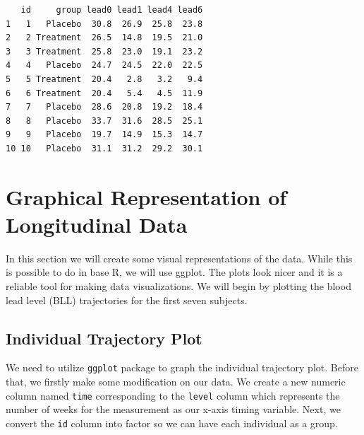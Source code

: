 \documentclass[
  letterpaper,
  DIV=11,
  numbers=noendperiod]{scrreprt}
\newenvironment{Shaded}{\begin{snugshade}}{\end{snugshade}}
\newcommand{\CommentTok}[1]{\textcolor[rgb]{0.37,0.37,0.37}{#1}}
\newcommand{\DecValTok}[1]{\textcolor[rgb]{0.68,0.00,0.00}{#1}}
\newcommand{\FunctionTok}[1]{\textcolor[rgb]{0.28,0.35,0.67}{#1}}
\newcommand{\NormalTok}[1]{\textcolor[rgb]{0.00,0.23,0.31}{#1}}
\newcommand{\OtherTok}[1]{\textcolor[rgb]{0.00,0.23,0.31}{#1}}
\newcommand{\SpecialCharTok}[1]{\textcolor[rgb]{0.37,0.37,0.37}{#1}}
\begin{document}
\begin{verbatim}
   id     group lead0 lead1 lead4 lead6
1   1   Placebo  30.8  26.9  25.8  23.8
2   2 Treatment  26.5  14.8  19.5  21.0
3   3 Treatment  25.8  23.0  19.1  23.2
4   4   Placebo  24.7  24.5  22.0  22.5
5   5 Treatment  20.4   2.8   3.2   9.4
6   6 Treatment  20.4   5.4   4.5  11.9
7   7   Placebo  28.6  20.8  19.2  18.4
8   8   Placebo  33.7  31.6  28.5  25.1
9   9   Placebo  19.7  14.9  15.3  14.7
10 10   Placebo  31.1  31.2  29.2  30.1
\end{verbatim}

\hypertarget{graphical-representation-of-longitudinal-data}{%
\section{Graphical Representation of Longitudinal
Data}\label{graphical-representation-of-longitudinal-data}}

In this section we will create some visual representations of the data.
While this is possible to do in base R, we will use ggplot. The plots
look nicer and it is a reliable tool for making data visualizations. We
will begin by plotting the blood lead level (BLL) trajectories for the
first seven subjects.

\hypertarget{individual-trajectory-plot}{%
\subsection{Individual Trajectory
Plot}\label{individual-trajectory-plot}}

We need to utilize \texttt{ggplot} package to graph the individual
trajectory plot. Before that, we firstly make some modification on our
data. We create a new numeric column named \texttt{time} corresponding
to the \texttt{level} column which represents the number of weeks for
the measurement as our x-axis timing variable. Next, we convert the
\texttt{id} column into factor so we can have each individual as a
group.

\begin{Shaded}
\end{Shaded}
\end{document}

